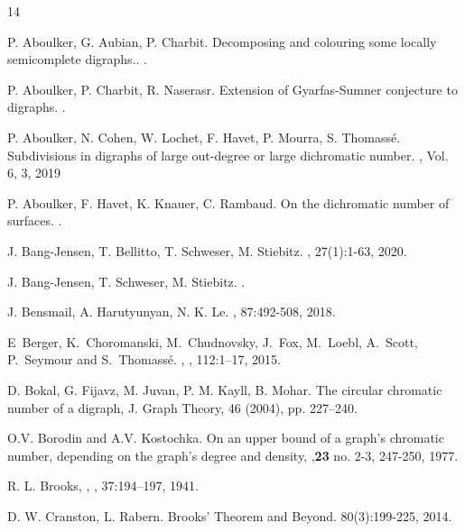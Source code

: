\documentclass[11pt]{article}
\begin{document}
\begin{thebibliography}{14}

P. Aboulker,  G. Aubian, P. Charbit. 
\newblock Decomposing and colouring some locally semicomplete digraphs..
.  


P. Aboulker,  P. Charbit, R. Naserasr. 
\newblock Extension of Gyarfas-Sumner conjecture to digraphs.
.  

P. Aboulker, N. Cohen, W. Lochet, F. Havet, P. Mourra, S. Thomass\'e.
\newblock Subdivisions  in digraphs of large out-degree or large dichromatic number.
, Vol. 6, 3, 2019

P. Aboulker, F. Havet, K. Knauer, C. Rambaud.
\newblock On the dichromatic number of surfaces.
.   



J. Bang-Jensen, T. Bellitto, T. Schweser, M. Stiebitz.
, 27(1):1-63, 2020. 

J. Bang-Jensen, T. Schweser, M. Stiebitz.
. 


J. Bensmail, A. Harutyunyan, N. K. Le.
, 87:492-508, 2018.

E~Berger, K.~Choromanski, M.~Chudnovsky, J.~Fox, M.~Loebl, A.~Scott, P.~Seymour and S.~Thomass\'e.
,
, 112:1--17, 2015.

 D. Bokal, G. Fijavz, M. Juvan, P. M. Kayll, B. Mohar. The circular chromatic number of a digraph, J. Graph Theory, 46 (2004), pp. 227--240.

O.V. Borodin and A.V. Kostochka.
\newblock On an upper bound of a graph's chromatic number,
depending on the graph's degree and density, 
 ,\textbf{23} no. 2-3, 247-250, 1977.

R. L. Brooks,
,
, 37:194--197, 1941.


D. W. Cranston, L. Rabern. 
\newblock Brooks' Theorem and Beyond.
 80(3):199-225, 2014.


\end{thebibliography}
\end{document}
